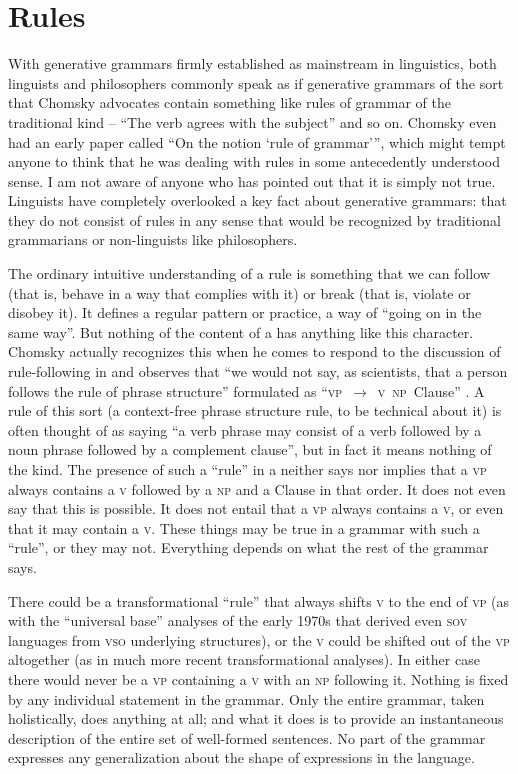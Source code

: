 \documentclass[output=paper]{langscibook}
\begin{document}
\section{Rules}
\label{sec:pullum:rules}

With generative grammars firmly established as mainstream in linguistics, both linguists and philosophers commonly speak as if generative grammars of the sort that Chomsky advocates contain something like rules of grammar of the traditional kind -- ``The verb agrees with the subject'' and so on. Chomsky even had an early paper called ``On the notion `rule of grammar'\thinspace'', which might tempt anyone to think that he was dealing with rules in some antecedently understood sense. I am not aware of anyone who has pointed out that it is simply not true. Linguists have completely overlooked a key fact about generative grammars: that they do not consist of rules in any sense that would be recognized by traditional grammarians or non-linguists like philosophers.

The ordinary intuitive understanding of a rule is something that we can follow (that is, behave in a way that complies with it) or break (that is, violate or disobey it).  It defines a regular pattern or practice, a way of ``going on in the same way''.  But nothing of the content of a  has anything like this character. Chomsky actually recognizes this when he comes to respond to the discussion of rule-following in \citet{Kripke82} and observes that ``we would not say, as scientists, that a person follows the rule of phrase structure'' formulated as ``\textsc{vp}~$\rightarrow$~\textsc{v}~\textsc{np}~Clause'' \citep[243]{Chomsky86KL}. A rule of this sort (a context-free phrase structure rule, to be technical about it) is often thought of as saying ``a verb phrase may consist of a verb followed by a noun phrase followed by a complement clause'', but in fact it means nothing of the kind.  The presence of such a ``rule'' in a  neither says nor implies that a \textsc{vp} always contains a \textsc{v} followed by a \textsc{np} and a Clause in that order.  It does not even say that this is possible.  It does not entail that a \textsc{vp} always contains a \textsc{v}, or even that it may contain a \textsc{v}.  These things may be true in a grammar with such a ``rule'', or they may not. Everything depends on what the rest of the grammar says.

There could be a transformational ``rule'' that always shifts \textsc{v} to the end of \textsc{vp} (as with the ``universal base'' analyses of the early 1970s that derived even \textsc{sov} languages from \textsc{vso} underlying structures), or the \textsc{v} could be shifted out of the \textsc{vp} altogether (as in much more recent transformational analyses).  In either case there would never be a \textsc{vp} containing a \textsc{v} with an \textsc{np} following it. Nothing is fixed by any individual statement in the grammar. Only the entire grammar, taken holistically, does anything at all; and what it does is to provide an instantaneous description of the entire set of well-formed sentences. No part of the grammar expresses any generalization about the shape of expressions in the language.
\end{document}
